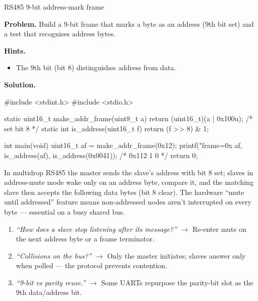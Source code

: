 \begin{gymproblem}{RS485 9-bit address-mark frame}

\textbf{Problem.} Build a 9-bit frame that marks a byte as an address (9th bit
set) and a test that recognises address bytes.

\textbf{Hints.}
\begin{itemize}
\item The 9th bit (bit 8) distinguishes address from data.
\end{itemize}

\attempt

\textbf{Solution.}
\begin{cgym}
#include <stdint.h>
#include <stdio.h>

static uint16_t make_addr_frame(uint8_t a) { return (uint16_t)(a | 0x100u); }  /* set bit 8 */
static int      is_address(uint16_t f)      { return (f >> 8) & 1; }

int main(void) {
    uint16_t af = make_addr_frame(0x12);
    printf("frame=0x%
           af, is_address(af), is_address(0x0041));   /* 0x112 1 0 */
    return 0;
}
\end{cgym}

In multidrop RS485 the master sends the slave's address with bit 8 set; slaves
in address-mute mode wake only on an address byte, compare it, and the matching
slave then accepts the following data bytes (bit 8 clear). The hardware
``mute until addressed'' feature means non-addressed nodes aren't interrupted on
every byte --- essential on a busy shared bus.

\followups
\begin{enumerate}
\item \emph{``How does a slave stop listening after its message?''}
  $\rightarrow$ Re-enter mute on the next address byte or a frame terminator.
\item \emph{``Collisions on the bus?''} $\rightarrow$ Only the master initiates;
  slaves answer only when polled --- the protocol prevents contention.
\item \emph{``9-bit vs parity reuse.''} $\rightarrow$ Some UARTs repurpose the
  parity-bit slot as the 9th data/address bit.
\end{enumerate}
\end{gymproblem}


